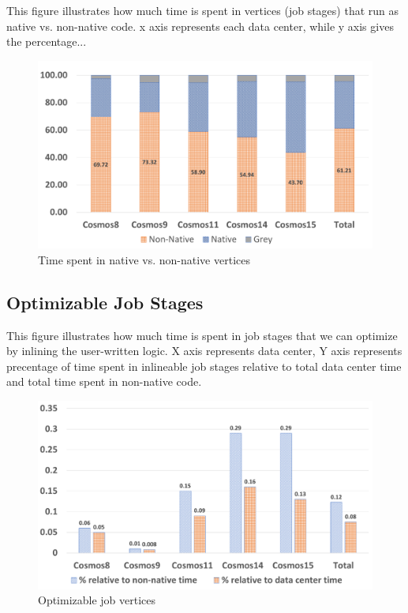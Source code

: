 This figure illustrates how much time is spent in vertices (job stages) that run as native vs. non-native code. x axis represents each data center, while y axis gives the percentage... 
\begin{figure}[ht]
\includegraphics[scale = 0.7]{graphs/proportions}
\caption{Time spent in native vs. non-native vertices}
\end{figure}

\subsection{Optimizable Job Stages}

This figure illustrates how much time is spent in job stages that we can optimize by inlining the user-written logic. X axis represents data center, Y axis represents precentage of time spent in inlineable job stages relative to total data center time and total time spent in non-native code.

\begin{figure}[ht]
\includegraphics[scale=0.8]{graphs/optimizable}
\caption{Optimizable job vertices}
\end{figure}

